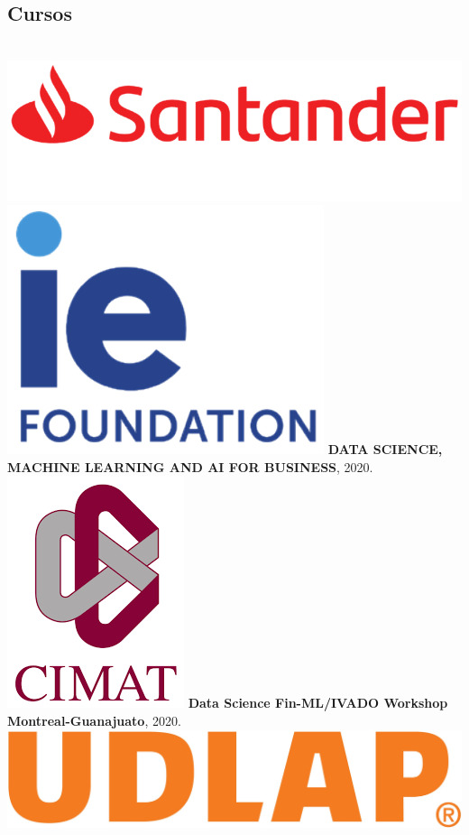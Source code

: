 \documentclass[]{friggeri-cv}
\begin{document}
\begin{aside}
	\section{Cursos}
	~
	\includegraphics[scale=0.08]{img/santander.png}\includegraphics[scale=0.08]{img/ie.png}
	\textbf{DATA SCIENCE, MACHINE LEARNING AND AI FOR BUSINESS}, 2020.
	\includegraphics[scale=0.15]{img/cimat.png}
	\textbf{Data Science Fin-ML/IVADO Workshop Montreal-Guanajuato}, 2020.
	\includegraphics[scale=0.025]{img/UDLAP.jpg}

\end{aside}
\end{document}
